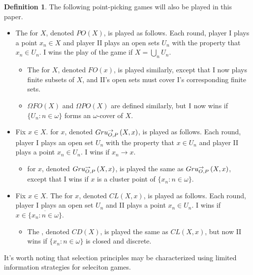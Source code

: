 \documentclass{amsart}
\theoremstyle{plain}
\theoremstyle{definition}
\newtheorem{definition}[theorem]{Definition}
\theoremstyle{remark}
\theoremstyle{plain}
\theoremstyle{definition}
\theoremstyle{remark}
\begin{document}
\begin{definition}
 The following point-picking games will also be played in this paper.
  \begin{itemize}
   \item The  for \(X\), denoted \(PO(X)\), is played as follows. Each round, player I plays a point \(x_n \in X\) and player II plays an open sets \(U_n\) with the property that \(x_n \in U_n\). I wins the play of the game if \(X = \bigcup_n U_n\).
\begin{itemize}
   \item The  for \(X\), denoted \(FO(x)\), is played similarly, except that I now plays finite subsets of \(X\), and II's open sets must cover I's corresponding finite sets.
   \item \(\Omega FO(X)\) and \(\Omega PO(X)\) are defined similarly, but \(\mathrm{I}\) now wins if \(\{U_n : n \in \omega\}\) forms an \(\omega\)-cover of \(X\).
\end{itemize}
   \item Fix \(x \in X\).  for \(x\), denoted \(Gru_{O,P}^{\to}\left({X},{x}\right)\), is played as follows. Each round, player I plays an open set \(U_n\) with the property that \(x \in U_n\) and player II plays a point \(x_n \in U_n\). I wins if \(x_n \to x\).
\begin{itemize}
   \item {} for \(x\), denoted \(Gru_{O,P}^{\leadsto}\left({X},{x}\right)\), is played the same as \(Gru_{O,P}^{\to}\left({X},{x}\right)\), except that I wins if \(x\) is a cluster point of \(\{x_n : n \in \omega\}\).
\end{itemize}
   \item Fix \(x \in X\). The  for \(x\), denoted \(CL(X,x)\), is played as follows. Each round, player I plays an open set \(U_n\) and II plays a point \(x_n \in U_n\). I wins if \(x \in \overline{\{x_n : n \in \omega\}}\).
\begin{itemize}
   \item The , denoted \(CD(X)\), is played the same as \(CL(X,x)\), but now II wins if \(\{x_n : n \in \omega\}\) is closed and discrete.
 \end{itemize}
\end{itemize}
\end{definition}

It's worth noting that selection principles may be characterized
using limited information strategies for seleciton games.
\end{document}
